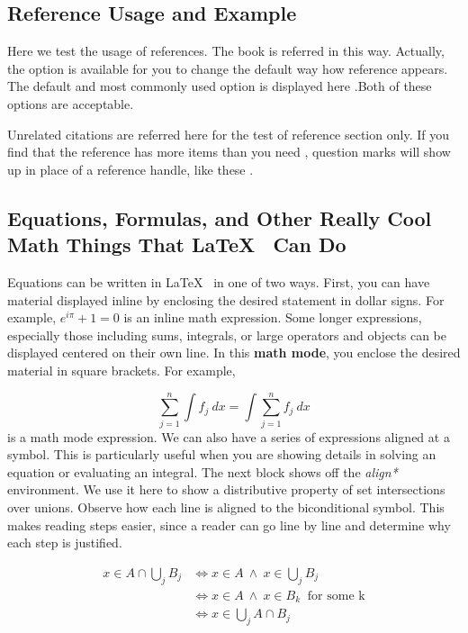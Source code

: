 \subsection{Reference Usage and Example}

Here we test the usage of references. The book\cite{REALCAR} 
is referred in this way. Actually, the option is available for you to change the default way how reference appears. The default and most commonly used option \cite{einstein} is displayed here \cite{Barn-JORVQ}.Both of these options are acceptable. 

Unrelated citations are referred here for the test of reference section only\cite{TAMU}. If you
find that the reference \cite{GIGEM} has more items than you need \cite{WAGFJ}, question marks will show up in place of a reference handle, like these \cite{Over9000}.

\subsection{Equations, Formulas, and Other Really Cool Math Things That \LaTeX ~ Can Do}

Equations can be written in \LaTeX ~ in one of two ways. First, you can have material displayed inline by enclosing the desired statement in dollar signs. For example, $e^{i\pi}+1=0$ is an inline math expression. Some longer expressions, especially those including sums, integrals, or large operators and objects can be displayed centered on their own line. In this \textbf{math mode}, you enclose the desired material in square brackets. For example,

\[ \sum_{j = 1} ^n \int f_j \ dx = \int \sum_{j = 1} ^n f_j \ dx \]
is a math mode expression. We can also have a series of expressions aligned at a symbol. This is particularly useful when you are showing details in solving an equation or evaluating an integral. The next block shows off the \textit{align*} environment. We use it here to show a distributive property of set intersections over unions. Observe how each line is aligned to the biconditional symbol. This makes reading steps easier, since a reader can go line by line and determine why each step is justified.

\begin{align*}
x \in A \cap \bigcup_{j} B_j &\iff x \in A \ \wedge \ x \in \bigcup_{j} B_j \\
&\iff x \in A \ \wedge \ x \in B_k \ \text{ for some k} \\
&\iff x \in \bigcup_{j} A \cap B_j
\end{align*}

